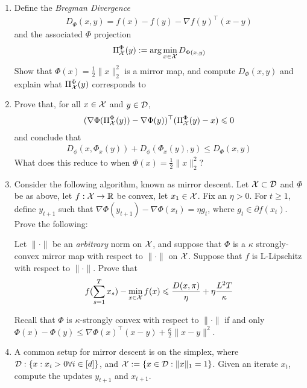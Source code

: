 \documentclass[12pt]{article}
\begin{document}
\begin{enumerate}
\item
Define the \emph{Bregman Divergence}
\begin{eqnarray}
D_{\Phi}(x,y) = f(x) - f(y) - \nabla f(y)^{\top}(x-y)
\end{eqnarray}
and the associated $\Phi$ projection
\begin{eqnarray}
\Pi_{{\cal X}}^{\Phi}(y):= \arg\min_{x \in {\cal X}} D_{\Phi(x,y)}
\end{eqnarray}
Show that $\Phi(x) = \frac{1}{2}\|x\|^2_2$ is a mirror map, and compute $D_{\Phi}(x,y)$ and explain what $\Pi_{{\cal X}}^{\Phi}(y)$ corresponds to
\item
Prove that, for all $x \in {\cal X}$ and $y \in {\cal D}$,
\begin{eqnarray}
(\nabla \Phi(\Pi_{{\cal X}}^{\Phi}(y)) - \nabla \Phi(y))^\top(\Pi_{{\cal X}}^{\Phi}(y) - x) \leqslant 0
\end{eqnarray}
and conclude that
\begin{eqnarray}
D_{\phi}(x,\Phi_{x}(y)) + D_{\phi}(\Phi_{x}(y),y) \le D_{\Phi}(x,y) 
\end{eqnarray}
What does this reduce to when $\Phi(x) = \frac{1}{2}\|x\|^2_2$?
\item
Consider the following algorithm, known as mirror descent. Let ${\cal X} \subset {\cal D}$ and $\Phi$ be as above, let $f: {\cal X} \to \mathbb{R}$ be convex, let $x_1  \in {\cal X}$. Fix an $\eta > 0$. For $t \ge 1$, define $y_{t+1}$ such that $\nabla \Phi(y_{t+1}) - \nabla \Phi(x_{t}) = \eta g_t$, where $g_t \in \partial f(x_t)$. Prove the following:
\begin{theorem*} Let $\|\cdot\|$ be an \emph{arbitrary} norm on ${\cal X}$, and suppose that $\Phi$ is a $\kappa$ strongly-convex mirror map with respect to $\|\cdot\|$ on ${\cal X}$. Suppose that $f$ is L-Lipschitz with respect to $\|\cdot\|$. Prove that 
\begin{eqnarray}
f(\sum_{s=1}^T x_s) - \min_{x \in {\cal X}} f(x) \leqslant \frac{D(x,\pi)}{\eta} + \eta \frac{L^2 T}{\kappa}
\end{eqnarray}
\end{theorem*}
Recall that $\Phi$ is $\kappa$-strongly convex with respect to $\|\cdot\|$ if and only $\Phi(x)  - \Phi(y) \le \nabla \Phi(x)^\top (x-y) + \frac{\kappa}{2}\|x-y\|^2$. 
\item
A common setup for mirror descent is on the simplex, where ${\cal D}: \{x: x_i > 0 \forall i \in [d]\}$, and ${\cal X} := \{x \in {\cal D}:\|x\|_1 = 1\}$. Given an iterate $x_t$, compute the updates $y_{t+1}$ and $x_{t+1}$. 
\end{enumerate}
\end{document}
